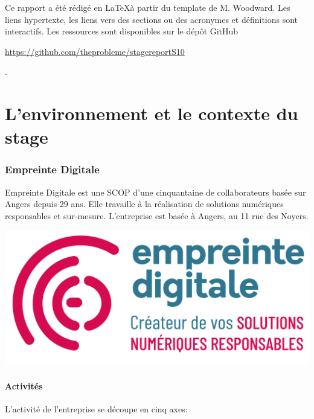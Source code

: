 \documentclass[12pt, a4paper, twoside]{article}
\begin{document}
Ce rapport a été rédigé en \LaTeX à partir du template de M. Woodward. 
Les liens hypertexte, les liens vers des sections ou des acronymes et définitions sont interactifs.
Les ressources sont disponibles sur le dépôt GitHub \begin{hilite}\url{https://github.com/theprobleme/stagereportS10}\end{hilite}.

\newpage
\part{L'environnement et le contexte du stage}
\section{Empreinte Digitale}
\noindent%
\begin{minipage}{.7\textwidth}%
Empreinte Digitale est une \gls{SCOP} d'une cinquantaine de collaborateurs basée sur Angers depuis 29 ans. 
Elle travaille à la réalisation de solutions numériques responsables et sur-mesure.
L'entreprise est basée à Angers, au 11 rue des Noyers.
\end{minipage}%
\hfill
\begin{minipage}{.3\textwidth}%
\begin{center}
    \includegraphics[scale=0.3]{src/logo_ed.png}
\end{center}
\end{minipage}%

\subsection{Activités}
\noindent%
L'activité de l'entreprise se découpe en cinq axes:
\end{document}
